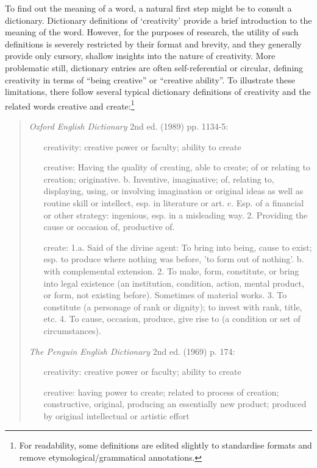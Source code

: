 \documentclass[10pt,letterpaper]{article}
\begin{document}
To find out the meaning of a word, a natural first step might be to consult a dictionary. Dictionary definitions of `creativity' provide a brief introduction to  the meaning of the word. However, for the purposes of research, the utility of such definitions is severely restricted by their format and brevity, and they generally provide only cursory, shallow insights into the nature of creativity. More problematic still, dictionary entries are often self-referential or circular,  defining creativity in terms of ``being creative'' or ``creative ability''. To illustrate these limitations, there follow several typical dictionary definitions of creativity and the related words creative and create:\footnote{For readability, some definitions are edited slightly to standardise formats and remove etymological/grammatical annotations.}
\begin{quotation}
\begin{description}
\item {\em Oxford English Dictionary} 2nd ed. (1989) pp. 1134-5:
	\begin{enumerate}
	\item[creativity:] creative power or faculty; ability to create
	\item [creative:] Having the quality of creating, able to create; of or relating to creation; originative. b. Inventive, imaginative; of, relating to, displaying, using, or involving imagination or original ideas as well as routine skill or intellect, esp. in literature or art. c. Esp. of a financial or other strategy: ingenious, esp. in a misleading way. 2. Providing the cause or occasion of, productive of.
\item [create:] 1.a. Said of the divine agent: To bring into being, cause to exist; esp. to produce where nothing was before, 'to form out of nothing'. b. with complemental extension. 2. To make, form, constitute, or bring into legal existence (an institution, condition, action, mental product, or form, not existing before). Sometimes of material works. 3. To constitute (a personage of rank or dignity); to invest with rank, title, etc. 4. To cause, occasion, produce, give rise to (a condition or set of circumstances).
	\end{enumerate}
\item {\em The Penguin English Dictionary} 2nd ed. (1969) p. 174:
	\begin{enumerate}
	\item[creativity:] creative power or faculty; ability to create
	\item[creative:] having power to create; related to process of creation; constructive, original, producing an essentially new product; produced by original intellectual or artistic effort 

\end{enumerate}
\end{description}
\end{quotation}
\end{document}
